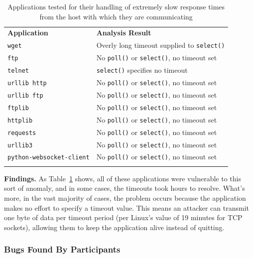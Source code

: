 \begin{table}[t]
  \scriptsize{}
  \begin{tabular}{l | l}
    \toprule{}
    {\bf Application}              & {\bf Analysis Result}\\
    {\tt wget}                     & Overly long timeout supplied to {\tt select()} \\
    {\tt ftp}                      & No {\tt poll()} or {\tt select()}, no timeout set \\
    {\tt telnet}                   & {\tt select()} specifies no timeout \\
    {\tt urllib http}              & No {\tt poll()} or {\tt select()}, no timeout set \\
    {\tt urllib ftp}               & No {\tt poll()} or {\tt select()}, no timeout set \\
    {\tt ftplib}                   & No {\tt poll()} or {\tt select()}, no timeout set \\
    {\tt httplib}                  & No {\tt poll()} or {\tt select()}, no timeout set \\
    {\tt requests}                 & No {\tt poll()} or {\tt select()}, no timeout set \\
    {\tt urllib3}                  & No {\tt poll()} or {\tt select()}, no timeout set \\
    {\tt python-websocket-client}  & No {\tt poll()} or {\tt select()}, no timeout set \\
    \bottomrule{}
  \end{tabular}
  \caption{Applications tested for their handling of extremely slow response
    times from the host with which they are communicating }
  \label{table:slowloris}
\end{table}


{\bf Findings.}
As Table~\ref{table:slowloris} shows, all of these
applications were vulnerable to this sort of anomaly,
and in some cases,
the timeouts took hours to resolve.
What's more, in the vast majority of
cases, the problem occurs because the application makes no effort to
specify a timeout value.  This means an attacker can transmit one byte of
data per timeout period (per Linux's value of 19 minutes for TCP sockets),
allowing them to keep the application alive instead of quitting.

\subsubsection{Bugs Found By Participants}

